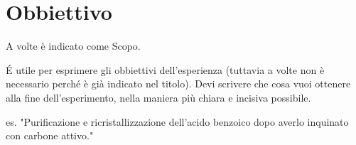 \section{Obbiettivo}
A volte \`e indicato come Scopo.

\'E utile per esprimere gli obbiettivi dell'esperienza (tuttavia a volte non è necessario perché è già indicato nel titolo). Devi scrivere che cosa vuoi ottenere alla fine dell'esperimento, nella maniera pi\`u chiara e incisiva possibile.

es. "Purificazione e ricristallizzazione dell'acido benzoico dopo averlo inquinato con carbone attivo."